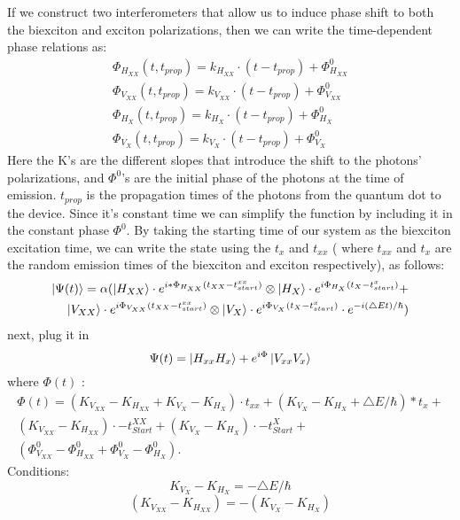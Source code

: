 If we construct two interferometers that allow us to induce phase shift to both the biexciton and exciton polarizations, then we can write the time-dependent phase relations as: 
\begin{equation}
\begin{aligned} 
		&\Phi_{H_{XX}}{(t,t_{prop})} = k_{H_{XX}}\cdot(t-t_{prop}) + \Phi^0_{H_{XX}} & \\	&\Phi_{V_{XX}}{(t,t_{prop})} = k_{V_{XX}}\cdot(t-t_{prop}) + \Phi^0_{V_{XX}} \\
        &\Phi_{H_{X}}{(t,t_{prop})} = k_{H_{X}}\cdot(t-t_{prop}) + \Phi^0_{H_{X}} &\\
		&\Phi_{V_{X}}{(t,t_{prop})} = k_{V_{X}}\cdot(t-t_{prop}) + \Phi^0_{V_{X}} 
\end{aligned}
\end{equation}
Here the  K's are the different slopes that introduce the shift to the photons' polarizations, and  $\Phi^0$'s are the initial phase of the photons at the time of emission. $t_{prop}$ is the propagation times of the photons from the quantum dot to the device. Since it's constant time we can simplify the function by including it in the constant phase $\Phi^0$.
By taking the starting time of our system as the biexciton excitation time, we can write the state using the $t_x$ and $t_{xx}$ ( where $t_{xx}$ and $t_{x}$ are the random emission times of the biexciton and exciton respectively), as follows:
\begin{equation}
\begin{split}
		\ket{\Psi(t)}= \alpha(\ket{H_{XX}}\cdot e^{i*\Phi_{H_{XX}}(t_{XX}-t^{xx}_{start})} \otimes 
		\ket{H_{X}}\cdot e^{i\Phi_{H_{X}}(t_{X}-t^{x}_{start})}+\\
        \ket{V_{XX}}\cdot e^{i\Phi_{V_{XX}}(t_{XX}-t^{xx}_{start})} \otimes 
		\ket{V_{X}}\cdot e^{i\Phi_{V_{X}}(t_{X}-t^{x}_{start})}\cdot e^{-i(\triangle Et)/\hslash})	
  \end{split}
\end{equation} 
next, plug it in
\begin{equation}
	\Psi(t) = \ket{H_{xx}H_x}+e^{i\Phi}\ket{V_{xx}V_x}
\end{equation}
where $\Phi(t)$ :
\begin{equation}
\begin{split}  
	\Phi(t) = (K_{V_{XX}}-K_{H_{XX}}+K_{V_X} - K_{H_X})\cdot t_{xx}+(K_{V_X}-K_{H_X} + \triangle E/\hbar)*t_x +\\
 (K_{V_{XX}} - K_{H_{XX}})\cdot-t^{XX}_{Start} +(K_{V_X}-K_{H_X})\cdot-t^X_{Start}+\\
 (\Phi^0_{V_{XX}}-\Phi^0_{H_{XX}}+\Phi^0_{V_{X}}-\Phi^0_{H_{X}}).
 \end{split}
\end{equation}
Conditions:
\begin{equation}
	K_{V_X}-K_{H_X} = -\triangle E/\hbar
\end{equation}
\begin{equation}
	(K_{V_{XX}} -K_{H_{XX}}) = -(K_{V_X}-K_{H_X})
\end{equation}
